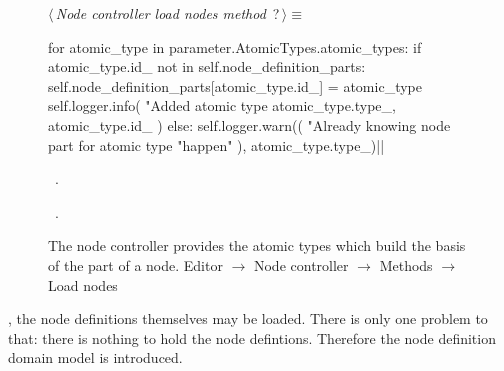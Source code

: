 \documentclass[%
    a4paper,    %
    justified,  %
    nobib,      %
    openany     %
]{tufte-book}
\makeatletter
\renewcommand{\label}[1]{\@tufte@label{##1}}%
\makeatother
\begin{document}
\begin{figure}
\begin{flushleft} \small
\begin{minipage}{\linewidth}\label{scrap119}\raggedright\small
{} $\langle\,${\itshape Node controller load nodes method}\nobreak\ {\footnotesize {?}}$\,\rangle\equiv$
\vspace{-1ex}
\begin{pythoncode}
for atomic_type in parameter.AtomicTypes.atomic_types:
    if atomic_type.id_ not in self.node_definition_parts:
        self.node_definition_parts[atomic_type.id_] = atomic_type
        self.logger.info(
            "Added atomic type %
            atomic_type.type_, atomic_type.id_
        )
    else:
        self.logger.warn((
            "Already knowing node part for atomic type %
            "happen"
        ), atomic_type.type_)|\NWsep|
\end{pythoncode}
\vspace{1.5ex}
\footnotesize
\begin{list}{}{\setlength{\itemsep}{-\parsep}\setlength{\itemindent}{-\leftmargin}}
\item \NWtxtMacroDefBy\ .
\item \NWtxtMacroRefIn\ .

\item{}
\end{list}
\end{minipage}\vspace{4ex}
\end{flushleft}
\caption{The node controller provides the atomic types which build the basis of
  the part of a node.
  \newline{}\newline{}Editor $\rightarrow$ Node controller $\rightarrow$ Methods
  $\rightarrow$ Load nodes}
\label{editor:lst:node-controller:methods:load-nodes:atomic-types}
\end{figure}

, the node definitions
themselves may be loaded. There is only one problem to that: there is nothing to
hold the node defintions. Therefore the node definition domain model is
introduced.
\end{document}
